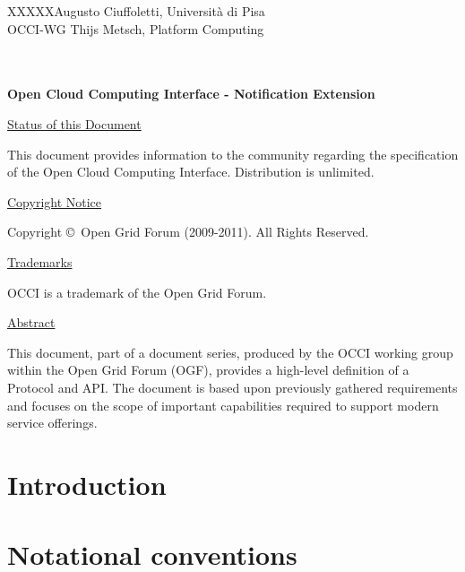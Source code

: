 \documentclass[10pt,a4paper]{article}
\newcommand{\doccode}{XXXXX}
\begin{document}
\thispagestyle{empty}

\doccode \hfill Augusto Ciuffoletti, Università di Pisa\\ 
OCCI-WG \hfill Thijs Metsch, Platform Computing\\
\\
\\

\vspace*{0.5in}

\begin{Large}
\textbf{Open Cloud Computing Interface - Notification Extension}
\end{Large}

\vspace*{0.5in}

\underline{Status of this Document}

This document provides information to the community regarding the
specification of the Open Cloud Computing Interface. Distribution is
unlimited.

\underline{Copyright Notice}

Copyright \copyright ~Open Grid Forum (2009-2011). All Rights Reserved.

\underline{Trademarks}

OCCI is a trademark of the Open Grid Forum.

\underline{Abstract}

This document, part of a document series, produced by the OCCI working
group within the Open Grid Forum (OGF), provides a high-level
definition of a Protocol and API. The document is based upon
previously gathered requirements and focuses on the scope of important
capabilities required to support modern service offerings.


\newpage
\tableofcontents
\newpage

\section{Introduction}


\section{Notational conventions}


\newcommand{\smx}{{\bf Notify}}
\newcommand{\ntfl}{{\bf Notification}}
\end{document}
